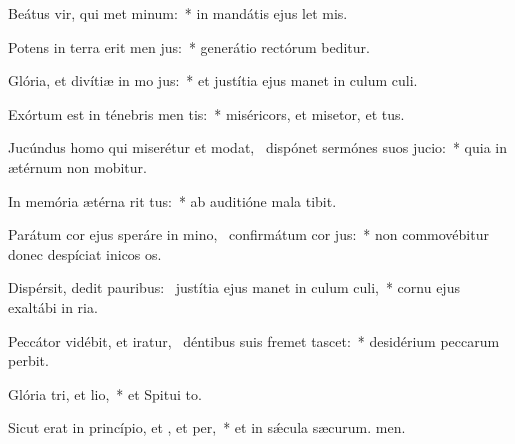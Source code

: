 \item Beátus vir, qui met minum:~* in mandátis ejus let mis.
\item Potens in terra erit men jus:~* generátio rectórum beditur.
\item Glória, et divítiæ in mo jus:~* et justítia ejus manet in culum culi.
\item Exórtum est in ténebris men tis:~* miséricors, et misetor, et tus.
\item Jucúndus homo qui miserétur et modat,~\pscross{} dispónet sermónes suos  jucio:~* quia in ætérnum non mobitur.
\item In memória ætérna rit tus:~* ab auditióne mala  tibit.
\item Parátum cor ejus speráre in mino,~\pscross{} confirmátum  cor jus:~* non commovébitur donec despíciat inicos os.
\item Dispérsit, dedit pauribus:~\pscross{} justítia ejus manet in culum culi,~* cornu ejus exaltábi in ria.
\item Peccátor vidébit, et iratur,~\pscross{} déntibus suis fremet  tascet:~* desidérium peccarum perbit.
\item Glória tri, et lio,~* et Spitui to.
\item Sicut erat in princípio, et , et per,~* et in sǽcula sæcurum. men.
